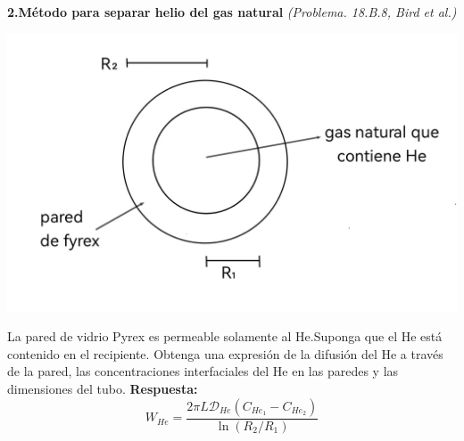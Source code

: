 \textbf{2.Método para separar helio del gas natural} \textit{(Problema. 18.B.8, Bird et al.)}
\flushleft
\vspace{0.4cm}
\begin{minipage}{0.4\textwidth} %
    \includegraphics[width=\linewidth]{./Capitulo2/Imagenes/imagen-2.jpg} %
\end{minipage}
\hfill %
\begin{minipage}{0.55\textwidth} %
La pared de vidrio Pyrex es permeable solamente al He.Suponga que el He está contenido en el recipiente. Obtenga una expresión de la difusión del He a través de la pared, las concentraciones interfaciales del He en las paredes y las dimensiones del tubo.
\vspace{0.5cm} %
\flushleft
\textbf{Respuesta:
\[
W_{He} = \frac{2\pi L \mathscr{D}_{He} (C_{He_{1}} - C_{He_{2}})}{\ln (R_2/R_1)}
\]}
\end{minipage}
\vspace{0.5cm}

